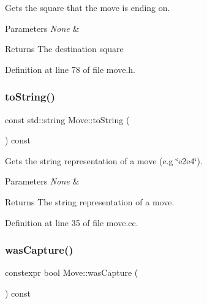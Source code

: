 Gets the square that the move is ending on. 


\begin{DoxyParams}{Parameters}
{\em None} & \\
\hline
\end{DoxyParams}
\begin{DoxyReturn}{Returns}
The destination square 
\end{DoxyReturn}


Definition at line 78 of file move.\+h.

\mbox{\label{classMove_a521cf6fe1679a7354ee007037df2da34}} 
\subsubsection{\texorpdfstring{to\+String()}{toString()}}
{\footnotesize\ttfamily const std\+::string Move\+::to\+String (\begin{DoxyParamCaption}{ }\end{DoxyParamCaption}) const\hspace{0.3cm}{\ttfamily [noexcept]}}



Gets the string representation of a move (e.\+g \char`\"{}e2e4\char`\"{}). 


\begin{DoxyParams}{Parameters}
{\em None} & \\
\hline
\end{DoxyParams}
\begin{DoxyReturn}{Returns}
The string representation of a move. 
\end{DoxyReturn}


Definition at line 35 of file move.\+cc.

\mbox{\label{classMove_aa270da1cc5c6f10882cd14e9a61d2ebe}} 
\subsubsection{\texorpdfstring{was\+Capture()}{wasCapture()}}
{\footnotesize\ttfamily constexpr bool Move\+::was\+Capture (\begin{DoxyParamCaption}{ }\end{DoxyParamCaption}) const\hspace{0.3cm}{\ttfamily [inline]}}



